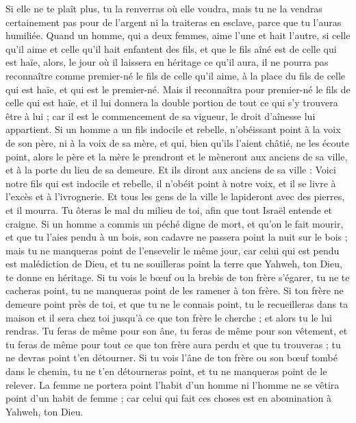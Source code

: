 \begin{multicols}{2}
Si elle ne te plaît plus, tu la renverras où elle voudra, mais tu ne la vendras certainement pas pour de l'argent ni la traiteras en esclave, parce que tu l'auras humiliée.
Quand un homme, qui a deux femmes, aime l'une et hait l’autre, si celle qu’il aime et celle qu’il hait enfantent des fils, et que le fils aîné est de celle qui est haïe,
alors, le jour où il laissera en héritage ce qu’il aura, il ne pourra pas reconnaître comme premier-né le fils de celle qu’il aime, à la place du fils de celle qui est haïe, et qui est le premier-né.
Mais il reconnaîtra pour premier-né le fils de celle qui est haïe, et il lui donnera la double portion de tout ce qui s’y trouvera être à lui ; car il est le commencement de sa vigueur, le droit d'aînesse lui appartient.
Si un homme a un fils indocile et rebelle, n'obéissant point à la voix de son père, ni à la voix de sa mère, et qui, bien qu'ils l'aient châtié, ne les écoute point,
alors le père et la mère le prendront et le mèneront aux anciens de sa ville, et à la porte du lieu de sa demeure.
Et ils diront aux anciens de sa ville : Voici notre fils qui est indocile et rebelle, il n'obéit point à notre voix, et il se livre à l’excès et à l’ivrognerie.
Et tous les gens de la ville le lapideront avec des pierres, et il mourra. Tu ôteras le mal du milieu de toi, afin que tout Israël entende et craigne.
Si un homme a commis un péché digne de mort, et qu'on le fait mourir, et que tu l’aies pendu à un bois,
son cadavre ne passera point la nuit sur le bois ; mais tu ne manqueras point de l'ensevelir le même jour, car celui qui est pendu est malédiction de Dieu, et tu ne souilleras point la terre que Yahweh, ton Dieu, te donne en héritage.
\VerseOne{}Si tu vois le bœuf ou la brebis de ton frère s’égarer, tu ne te cacheras point, tu ne manqueras point de les ramener à ton frère.
Si ton frère ne demeure point près de toi, et que tu ne le connais point, tu le recueilleras dans ta maison et il sera chez toi jusqu'à ce que ton frère le cherche ; et alors tu le lui rendras.
Tu feras de même pour son âne, tu feras de même pour son vêtement, et tu feras de même pour tout ce que ton frère aura perdu et que tu trouveras ; tu ne devras point t’en détourner.
Si tu vois l'âne de ton frère ou son bœuf tombé dans le chemin, tu ne t’en détourneras point, et tu ne manqueras point de le relever.
La femme ne portera point l'habit d'un homme ni l'homme ne se vêtira point d'un habit de femme ; car celui qui fait ces choses est en abomination à Yahweh, ton Dieu.

\end{multicols}
